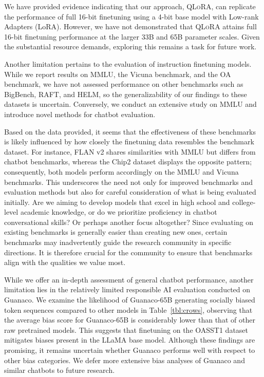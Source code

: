 We have provided evidence indicating that our approach, \textsc{QLoRA}, can replicate the performance of full 16-bit finetuning using a 4-bit base model with Low-rank Adapters (LoRA). However, we have not demonstrated that \textsc{QLoRA} attains full 16-bit finetuning performance at the larger 33B and 65B parameter scales. Given the substantial resource demands, exploring this remains a task for future work.

Another limitation pertains to the evaluation of instruction finetuning models. While we report results on MMLU, the Vicuna benchmark, and the OA benchmark, we have not assessed performance on other benchmarks such as BigBench, RAFT, and HELM, so the generalizability of our findings to these datasets is uncertain. Conversely, we conduct an extensive study on MMLU and introduce novel methods for chatbot evaluation.

Based on the data provided, it seems that the effectiveness of these benchmarks is likely influenced by how closely the finetuning data resembles the benchmark dataset. For instance, FLAN v2 shares similarities with MMLU but differs from chatbot benchmarks, whereas the Chip2 dataset displays the opposite pattern; consequently, both models perform accordingly on the MMLU and Vicuna benchmarks. This underscores the need not only for improved benchmarks and evaluation methods but also for careful consideration of what is being evaluated initially. Are we aiming to develop models that excel in high school and college-level academic knowledge, or do we prioritize proficiency in chatbot conversational skills? Or perhaps another focus altogether? Since evaluating on existing benchmarks is generally easier than creating new ones, certain benchmarks may inadvertently guide the research community in specific directions. It is therefore crucial for the community to ensure that benchmarks align with the qualities we value most.

While we offer an in-depth assessment of general chatbot performance, another limitation lies in the relatively limited responsible AI evaluation conducted on {Guanaco}. We examine the likelihood of {Guanaco}-65B generating socially biased token sequences compared to other models in Table~\ref{tbl:crows}, observing that the average bias score for {Guanaco}-65B is considerably lower than that of other raw pretrained models. This suggests that finetuning on the OASST1 dataset mitigates biases present in the LLaMA base model. Although these findings are promising, it remains uncertain whether {Guanaco} performs well with respect to other bias categories. We defer more extensive bias analyses of {Guanaco} and similar chatbots to future research.

